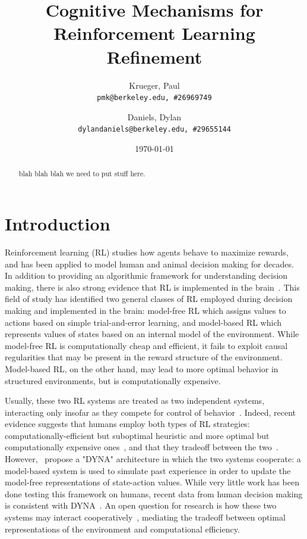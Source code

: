 \documentclass[notitlepage]{article}
\title{Cognitive Mechanisms for Reinforcement Learning Refinement}
\author{
  Krueger, Paul\\
  \texttt{pmk@berkeley.edu,\ \#26969749}
  \and
  Daniels, Dylan\\
  \texttt{dylandaniels@berkeley.edu,\ \#29655144}
}
\date{\today}
\begin{document}
\maketitle

\begin{abstract}
blah blah blah we need to put stuff here.
\end{abstract}

\section*{Introduction}

Reinforcement learning (RL) studies how agents behave to maximize rewards, and has been applied to model human and animal decision making for decades. In addition to providing an algorithmic framework for understanding decision making, there is also strong evidence that RL is implemented in the brain~\cite{daw2005uncertaintyl}. This field of study has identified two general classes of RL employed during decision making and implemented in the brain: model-free RL which assigns values to actions based on simple trial-and-error learning, and model-based RL which represents values of states based on an internal model of the environment. While model-free RL is computationally cheap and efficient, it fails to exploit causal regularities that may be present in the reward structure of the environment. Model-based RL, on the other hand, may lead to more optimal behavior in structured environments, but is computationally expensive.

Usually, these two RL systems are treated as two independent systems, interacting only insofar as they compete for control of behavior~\cite{dolan2013goals}. Indeed, recent evidence suggests that humans employ both types of RL strategies: computationally-efficient but suboptimal heuristic and more optimal but computationally expensive ones~\cite{wilson2014human}, and that they tradeoff between the two~\cite{wilson2015tradeoff}. However,~\cite{sutton1998reinforcement} propose a "DYNA" architecture in which the two systems cooperate: a model-based system is used to simulate past experience in order to update the model-free representations of state-action values. While very little work has been done testing this framework on humans, recent data from human decision making is consistent with DYNA~\cite{gershman2014retrospective}. An open question for research is how these two systems may interact cooperatively~\cite{gershman2015reinforcement}, mediating the tradeoff between optimal representations of the environment and computational efficiency.
\end{document}
